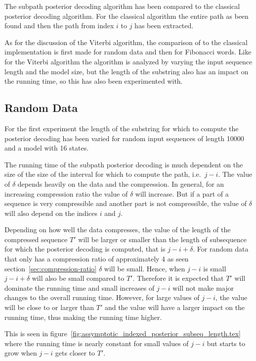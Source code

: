 The subpath posterior decoding algorithm has been compared to the classical
posterior decoding algorithm. For the classical algorithm the entire path as
been found and then the path from index $i$ to $j$ has been extracted.

As for the discussion of the Viterbi algorithm, the comparison of to the
classical implementation is first made for random data and then for Fibonacci
words. Like for the Viterbi algorithm the algorithm is analyzed by varying the
input sequence length and the model size, but the length of the substring also
has an impact on the running time, so this has also been experimented with.

\subsection{Random Data}

For the first experiment the length of the substring for which to compute the
posterior decoding has been varied for random input sequences of length 10000
and a model with 16 states.

The running time of the subpath posterior decoding is much dependent on the
size of the size of the interval for which to compute the path, i.e.\
$j-i$. The value of $\delta$ depends heavily on the data and the
compression. In general, for an increasing compression ratio the value of
$\delta$ will increase. But if a part of a sequence is very compressible and
another part is not compressible, the value of $\delta$ will also depend on the
indices $i$ and $j$.

Depending on how well the data compresses, the value of the length of the
compressed sequence $T'$ will be larger or smaller than the length of
subsequence for which the posterior decoding is computed, that is
$j - i + \delta$.  For random data that only has a compression ratio of
approximately 4 as seen section~\ref{sec:compression-ratio} $\delta$ will be
small. Hence, when $j - i$ is small $j - i + \delta$ will also be small
compared to $T'$. Therefore it is expected that $T'$ will dominate the running
time and small increases of $j - i$ will not make major changes to the overall
running time. However, for large values of $j - i$, the value will be close to
or larger than $T'$ and the value will have a larger impact on the running
time, thus making the running time higher.

This is seen in
figure~\ref{fig:assymptotic_indexed_posterior_subseq_length.tex} where the
running time is nearly constant for small values of $j - i$ but starts to grow
when $j - i$ gets closer to $T'$.

